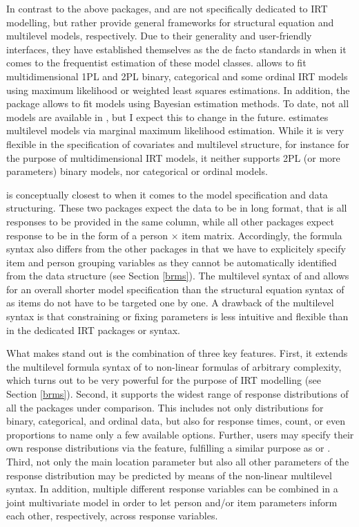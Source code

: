\documentclass[jss]{jss}
\begin{document}
In contrast to the above packages,  and  are not
specifically dedicated to IRT modelling, but rather provide general
frameworks for structural equation and multilevel models, respectively.
Due to their generality and user-friendly interfaces, they have
established themselves as the de facto standards in  when it
comes to the frequentist estimation of these model classes. 
allows to fit multidimensional 1PL and 2PL binary, categorical and some
ordinal IRT models using maximum likelihood or weighted least squares
estimations. In addition, the  package allows to fit
 models using Bayesian estimation methods. To date, not all
 models are available in , but I expect this to
change in the future.  estimates multilevel models via
marginal maximum likelihood estimation. While it is very flexible in the
specification of covariates and multilevel structure, for instance for
the purpose of multidimensional IRT models, it neither supports 2PL (or
more parameters) binary models, nor categorical or ordinal models.

 is conceptually closest to  when it comes to the
model specification and data structuring. These two packages expect the
data to be in long format, that is all responses to be provided in the
same column, while all other packages expect response to be in the form
of a person \(\times\) item matrix. Accordingly, the formula syntax also
differs from the other packages in that we have to explicitely specify
item and person grouping variables as they cannot be automatically
identified from the data structure (see Section \ref{brms}). The
multilevel syntax of  and  allows for an overall
shorter model specification than the structural equation syntax of
 as items do not have to be targeted one by one. A drawback
of the multilevel syntax is that constraining or fixing parameters is
less intuitive and flexible than in the dedicated IRT packages or
 syntax.

What makes  stand out is the combination of three key
features. First, it extends the multilevel formula syntax of 
to non-linear formulas of arbitrary complexity, which turns out to be
very powerful for the purpose of IRT modelling (see Section \ref{brms}).
Second, it supports the widest range of response distributions of all
the packages under comparison. This includes not only distributions for
binary, categorical, and ordinal data, but also for response times,
count, or even proportions to name only a few available options.
Further, users may specify their own response distributions via the
 feature, fulfilling a similar purpose as
 or . Third, not only the main
location parameter but also all other parameters of the response
distribution may be predicted by means of the non-linear multilevel
syntax. In addition, multiple different response variables can be
combined in a joint multivariate model in order to let person and/or
item parameters inform each other, respectively, across response
variables.
\end{document}
